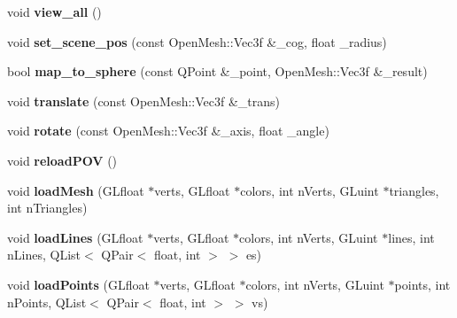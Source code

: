 \begin{DoxyCompactItemize}
void {\bfseries view\+\_\+all} ()
\item 
\mbox{\label{classMeshViewerWidget_ad829500f1d32ce5a405cc9816593243c}} 
void {\bfseries set\+\_\+scene\+\_\+pos} (const Open\+Mesh\+::\+Vec3f \&\+\_\+cog, float \+\_\+radius)
\item 
\mbox{\label{classMeshViewerWidget_a623ac597c208b98f5331a5df15d526db}} 
bool {\bfseries map\+\_\+to\+\_\+sphere} (const Q\+Point \&\+\_\+point, Open\+Mesh\+::\+Vec3f \&\+\_\+result)
\item 
\mbox{\label{classMeshViewerWidget_a94d5b8c1f8a94ce40e398b735438d8f7}} 
void {\bfseries translate} (const Open\+Mesh\+::\+Vec3f \&\+\_\+trans)
\item 
\mbox{\label{classMeshViewerWidget_ad033d669fb44ec33a36613eae4da0b67}} 
void {\bfseries rotate} (const Open\+Mesh\+::\+Vec3f \&\+\_\+axis, float \+\_\+angle)
\item 
\mbox{\label{classMeshViewerWidget_a9701f509f4fcad8c92879767dadb6de5}} 
void {\bfseries reload\+P\+OV} ()
\item 
\mbox{\label{classMeshViewerWidget_a6442eafad612bf98929c5bc252a7ee27}} 
void {\bfseries load\+Mesh} (G\+Lfloat $\ast$verts, G\+Lfloat $\ast$colors, int n\+Verts, G\+Luint $\ast$triangles, int n\+Triangles)
\item 
\mbox{\label{classMeshViewerWidget_a44910bc71f44356cf6fb871b56e63daf}} 
void {\bfseries load\+Lines} (G\+Lfloat $\ast$verts, G\+Lfloat $\ast$colors, int n\+Verts, G\+Luint $\ast$lines, int n\+Lines, Q\+List$<$ Q\+Pair$<$ float, int $>$ $>$ es)
\item 
\mbox{\label{classMeshViewerWidget_a20094dbd10ca460558f669aa4725d1c1}} 
void {\bfseries load\+Points} (G\+Lfloat $\ast$verts, G\+Lfloat $\ast$colors, int n\+Verts, G\+Luint $\ast$points, int n\+Points, Q\+List$<$ Q\+Pair$<$ float, int $>$ $>$ vs)
\end{DoxyCompactItemize}

